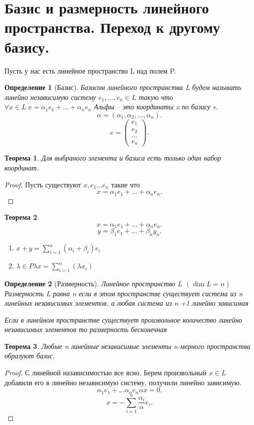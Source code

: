 \documentclass{scrartcl}
\newtheorem{theorem}{Теорема}
\newtheorem{definition}{Определение}
\begin{document}
\section{Базис и размерность линейного пространства. Переход к другому базису.}
Пусть у нас есть линейное пространство L над полем P.
\begin{definition}[Базис]
	Базисом линейного пространства L будем называть линейно независимую систему
	$e_1,\dots,e_{n} \in L$ такую что $\forall  x\in L ~ x = \alpha_1 e_1 + \dots + \alpha_{n}e_{n}$ Альфы -- это координаты x по базису e.
	\[
		\alpha = (\alpha_1,\alpha_2,\dots,\alpha_{n})
		.\]
	\[
		e = \begin{pmatrix}
			e_1   \\
			e_2   \\
			\dots \\
			e_{n}
		\end{pmatrix}
		.\]
\end{definition}
\begin{theorem}
	Для выбраного элемента и базиса есть только один набор координат.
\end{theorem}
\begin{proof}
	Пусть существуют $x, e_1 \dots e_{n}$ такие что
	\[
		x = \alpha_{1} e_{1} + \dots + \alpha_{n} e_{n}
		.\]
\end{proof}
\begin{theorem}
	\[
		x = \alpha_{1} e_1 + \dots + \alpha_{n} e_{n}
		.\]
	\[
		y = \beta_{1} e_1 + \dots + \beta_{n}y_{n}
		.\]
	\begin{enumerate}
		\item $x + y = \sum_{i=1}^{n} (\alpha_{i} + \beta_{i})e_{i}$
		\item $\lambda \in P \lambda x = \sum_{i = 1}^{n} (\lambda x_{i})$
	\end{enumerate}
\end{theorem}
\begin{definition}[Размерность]
	Линейное пространство $L$  $(\dim{L} = n)$ Размерность L равна n если в этом пространстве существует система из n линейных независимых элементов, а любая система из n +1 линейно зависимая

	Если в линейном пространстве существует произвольное количество линейно независимых элементов то размерность бесконечная
\end{definition}
\begin{theorem}
	Любые n линейные независимые элементы n-мерного пространства образуют базис.
\end{theorem}
\begin{proof}
	С линейной назависимостью все ясно. Берем произвольный $x \in L$ добавили его в линейно независимую систему, получили линейно зависимую.
	\[
		\alpha_1 e_1 +  \dots \alpha_{n}e_{n} \alpha x= 0
		.\]
	\[
		x = -\sum_{i = 1}^{n} \frac{\alpha_{i}}{\alpha}e_{i}
		.\]
\end{proof}
\end{document}
